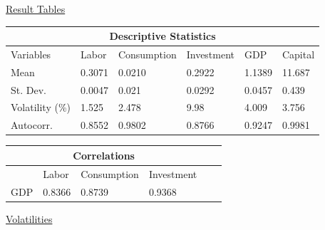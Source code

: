 \documentclass[12pt]{article}
\begin{document}
\begin{doublespace}
\begin{center}
\normalsize\underline{Result Tables}
\end{center}

\begin{center}
\begin{tabular}{ |p{2.5cm}|p{2.25cm}|p{2.25cm}|p{2.25cm}|p{2.25cm}|p{2.25cm}|  }
 \hline
 \multicolumn{6}{|c|}{Descriptive Statistics} \\
 \hline
 Variables & Labor & Consumption & Investment & GDP & Capital\\
 \hline
 Mean & 0.3071 & 0.0210 & 0.2922 & 1.1389 & 11.687 \\
 St. Dev. & 0.0047 & 0.021 & 0.0292 & 0.0457 & 0.439 \\
 Volatility (\%) & 1.525 & 2.478 & 9.98 & 4.009 & 3.756 \\
 Autocorr. & 0.8552 & 0.9802 & 0.8766 & 0.9247 & 0.9981 \\
 \hline
\end{tabular}
\end{center}

\bigskip
\begin{center}
\begin{tabular}{ |p{2.25cm}|p{2.25cm}|p{2.25cm}|p{2.25cm}|p{2.25cm}|p{2.25cm}|  }
 \hline
 \multicolumn{4}{|c|}{Correlations} \\
 \hline
 &Labor&Consumption&Investment\\
 \hline
 GDP&0.8366&0.8739&0.9368\\
 \hline
\end{tabular}
\end{center}

\bigskip
\begin{center}
\normalsize\underline{Volatilities}
\end{center}


\end{doublespace}
\end{document}

